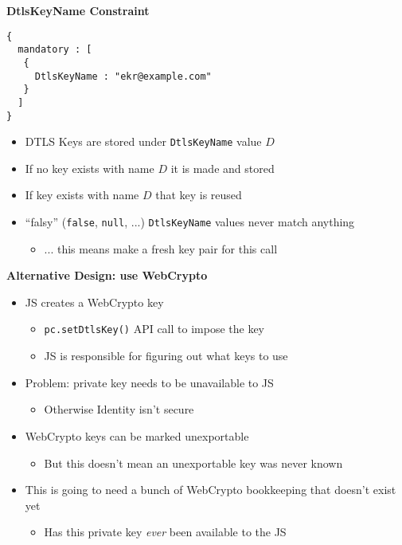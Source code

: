 \documentclass[helvetica]{seminar}
\newcommand{\heading}[1]{%
  \begin{center} 
    \large\bf 
    #1 
  \end{center} 
  \vspace{.4 in}}
\begin{document}
\begin{slide}
\heading{DtlsKeyName Constraint}

\vspace{-.25in}
\begin{verbatim}
{
  mandatory : [
   {
     DtlsKeyName : "ekr@example.com"
   }
  ] 
}
\end{verbatim}

\begin{itemize}
\item DTLS Keys are stored under \verb^DtlsKeyName^ value $D$
\item If no key exists with name $D$ it is made and stored
\item If key exists with name $D$ that key is reused
\item ``falsy'' (\verb^false^, \verb^null^, ...) \verb^DtlsKeyName^ values never match anything
  \begin{itemize}
    \item ... this means make a fresh key pair for this call
  \end{itemize}
\end{itemize}
\end{slide}


\begin{slide}
\heading{Alternative Design: use WebCrypto}

\begin{itemize}
\item JS creates a WebCrypto key
  \begin{itemize}
  \item \verb^pc.setDtlsKey()^ API call to impose the key
  \item JS is responsible for figuring out what keys to use
  \end{itemize}

\item Problem: private key needs to be unavailable to JS
  \begin{itemize}
    \item Otherwise Identity isn't secure
  \end{itemize}

\item WebCrypto keys can be marked unexportable
  \begin{itemize}
  \item But this doesn't mean an unexportable key was never known
  \end{itemize}

\item This is going to need a bunch of WebCrypto bookkeeping that doesn't exist 
yet
\begin{itemize}
\item Has this private key \emph{ever} been available to the JS
\end{itemize}
\end{itemize}

\end{slide}
\end{document}
